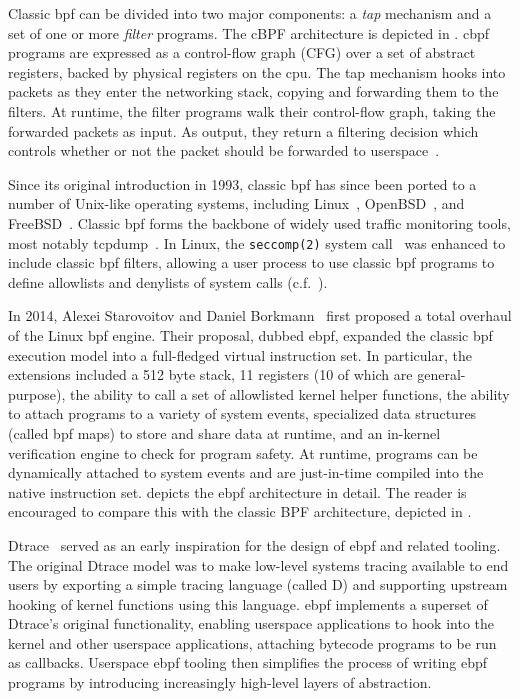 Classic \gls{bpf} can be divided into two major components: a \textit{tap} mechanism and a set
of one or more \textit{filter} programs. The cBPF architecture is depicted in
. \gls{cbpf} programs are expressed as a control-flow graph (CFG)
over a set of abstract registers, backed by physical registers on the \gls{cpu}. The tap
mechanism hooks into packets as they enter the networking stack, copying and forwarding
them to the filters. At runtime, the filter programs walk their control-flow graph, taking
the forwarded packets as input. As output, they return a filtering decision which controls
whether or not the packet should be forwarded to userspace~\cite{mccanne1993_bpf}.

Since its original introduction in 1993, classic \gls{bpf} has since been ported to
a number of Unix-like operating systems, including Linux~\cite{linux_bpf},
OpenBSD~\cite{openbsd_bpf}, and FreeBSD~\cite{freebsd_bpf}. Classic \gls{bpf} forms the
backbone of widely used traffic monitoring tools, most notably tcpdump~\cite{tcpdump,
mccanne1993_bpf}. In Linux, the \texttt{seccomp(2)} system
call~\cite{anderson2017_comparison} was enhanced to include classic \gls{bpf} filters,
allowing a user process to use classic \gls{bpf} programs to define allowlists and
denylists of system calls (c.f.\ ).

In 2014, Alexei Starovoitov and Daniel Borkmann~\cite{starovoitov2014_ebpf} first proposed
a total overhaul of the Linux \gls{bpf} engine. Their proposal, dubbed \gls{ebpf}, expanded the
classic \gls{bpf} execution model into a full-fledged virtual instruction set. In particular,
the extensions included a 512 byte stack, 11 registers (10 of which are general-purpose),
the ability to call a set of allowlisted kernel helper functions, the ability to attach
programs to a variety of system events, specialized data structures (called \gls{bpf} maps) to
store and share data at runtime, and an in-kernel verification engine to check for program
safety. At runtime, programs can be dynamically attached to system events and are
just-in-time compiled into the native instruction set.   depicts
the \gls{ebpf} architecture in detail. The reader is encouraged to compare this with the classic
BPF architecture, depicted in .

Dtrace~\cite{cantrill2004_dtrace, gregg2001_dtrace} served as an early inspiration for the
design of \gls{ebpf} and related tooling. The original Dtrace model was to make low-level
systems tracing available to end users by exporting a simple tracing language (called D)
and supporting upstream hooking of kernel functions using this language. \gls{ebpf}
implements a superset of Dtrace's original functionality, enabling userspace applications
to hook into the kernel and other userspace applications, attaching bytecode programs to
be run as callbacks.  Userspace \gls{ebpf} tooling then simplifies the process of writing
\gls{ebpf} programs by introducing increasingly high-level layers of abstraction.

